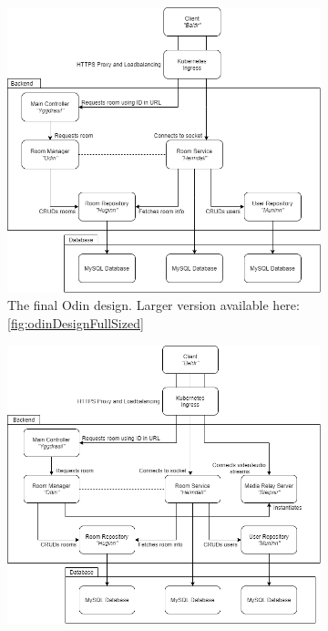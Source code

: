 \begin{figure}[H]
    \centering
    \begin{subfigure}[b]{0.48\textwidth}
        \centering
        \includegraphics[width=\textwidth]{Pictures/Odin Final Design (3).png}
        \caption{The final Odin design. Larger version available here: \ref{fig:odinDesignFullSized}}
        \label{fig:odinfinaldesign}
    \end{subfigure}
    \hfill
    \begin{subfigure}[b]{0.48\textwidth}
        \centering
        \includegraphics[width=\textwidth]{Pictures/Vili Final Design (4).png}

\end{subfigure}
\end{figure}
